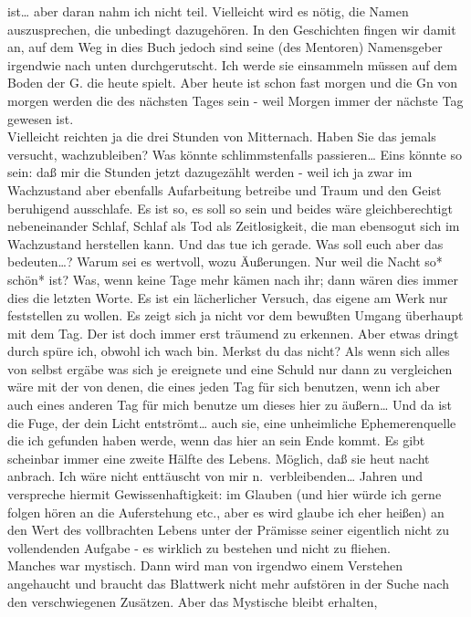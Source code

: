 \documentclass[
]{article}
\begin{document}
ist\ldots{} aber daran nahm ich nicht teil. Vielleicht wird es nötig,
die Namen auszusprechen, die unbedingt dazugehören. In den Geschichten
fingen wir damit an, auf dem Weg in dies Buch jedoch sind seine (des
Mentoren) Namensgeber irgendwie nach unten durchgerutscht. Ich werde sie
einsammeln müssen auf dem Boden der G. die heute spielt. Aber heute ist
schon fast morgen und die Gn von morgen werden die des nächsten Tages
sein - weil Morgen immer der nächste Tag gewesen ist.\\
Vielleicht reichten ja die drei Stunden von Mitternach. Haben Sie das
jemals versucht, wachzubleiben? Was könnte schlimmstenfalls
passieren\ldots{} Eins könnte so sein: daß mir die Stunden jetzt
dazugezählt werden - weil ich ja zwar im Wachzustand aber ebenfalls
Aufarbeitung betreibe und Traum und den Geist beruhigend ausschlafe. Es
ist so, es soll so sein und beides wäre gleichberechtigt nebeneinander
Schlaf, Schlaf als Tod als Zeitlosigkeit, die man ebensogut sich im
Wachzustand herstellen kann. Und das tue ich gerade. Was soll euch aber
das bedeuten\ldots? Warum sei es wertvoll, wozu Äußerungen. Nur weil die
Nacht so* schön* ist? Was, wenn keine Tage mehr kämen nach ihr; dann
wären dies immer dies die letzten Worte. Es ist ein lächerlicher
Versuch, das eigene am Werk nur feststellen zu wollen. Es zeigt sich ja
nicht vor dem bewußten Umgang überhaupt mit dem Tag. Der ist doch immer
erst träumend zu erkennen. Aber etwas dringt durch spüre ich, obwohl ich
wach bin. Merkst du das nicht? Als wenn sich alles von selbst ergäbe was
sich je ereignete und eine Schuld nur dann zu vergleichen wäre mit der
von denen, die eines jeden Tag für sich benutzen, wenn ich aber auch
eines anderen Tag für mich benutze um dieses hier zu äußern\ldots{} Und
da ist die Fuge, der dein Licht entströmt\ldots{} auch sie, eine
unheimliche Ephemerenquelle die ich gefunden haben werde, wenn das hier
an sein Ende kommt. Es gibt scheinbar immer eine zweite Hälfte des
Lebens. Möglich, daß sie heut nacht anbrach. Ich wäre nicht enttäuscht
von mir n.~verbleibenden\ldots{} Jahren und verspreche hiermit
Gewissenhaftigkeit: im Glauben (und hier würde ich gerne folgen hören an
die Auferstehung etc., aber es wird glaube ich eher heißen) an den Wert
des vollbrachten Lebens unter der Prämisse seiner eigentlich nicht zu
vollendenden Aufgabe - es wirklich zu bestehen und nicht zu fliehen.\\
Manches war mystisch. Dann wird man von irgendwo einem Verstehen
angehaucht und braucht das Blattwerk nicht mehr aufstören in der Suche
nach den verschwiegenen Zusätzen. Aber das Mystische bleibt erhalten,
\end{document}
